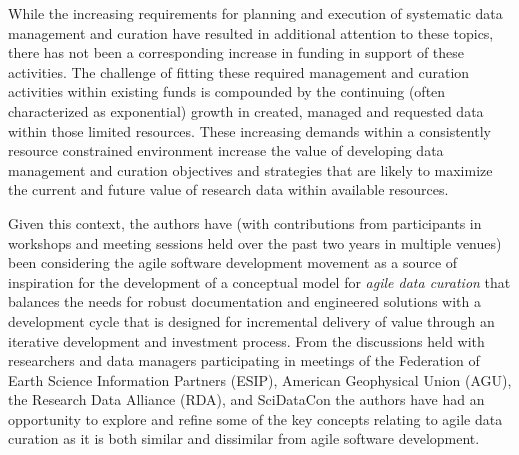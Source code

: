 \documentclass[paper]{ijdc-v9}
\begin{document}
While the increasing requirements for planning and execution of
systematic data management and curation have resulted in additional
attention to these topics, there has not been a corresponding increase
in funding in support of these activities. The challenge of fitting
these required management and curation activities within existing funds
is compounded by the continuing (often characterized as exponential)
growth
\autocites{turner_executive_2016}{national_aeronautics_and_space_administration_nasa_heasarc_2016}
in created, managed and requested data within those limited resources.
These increasing demands within a consistently resource constrained
environment increase the value of developing data management and
curation objectives and strategies that are likely to maximize the
current and future value of research data within available resources.

Given this context, the authors have (with contributions from
participants in workshops and meeting sessions held over the past two
years in multiple venues) been considering the agile software
development movement \autocite{beck_manifesto_2001} as a source of
inspiration for the development of a conceptual model for \emph{agile
data curation} that balances the needs for robust documentation and
engineered solutions with a development cycle that is designed for
incremental delivery of value through an iterative development and
investment process. From the discussions held with researchers and data
managers participating in meetings of the Federation of Earth Science
Information Partners (ESIP), American Geophysical Union (AGU), the
Research Data Alliance (RDA), and SciDataCon the authors have had an
opportunity to explore and refine some of the key concepts relating to
agile data curation as it is both similar and dissimilar from agile
software development.
\end{document}

